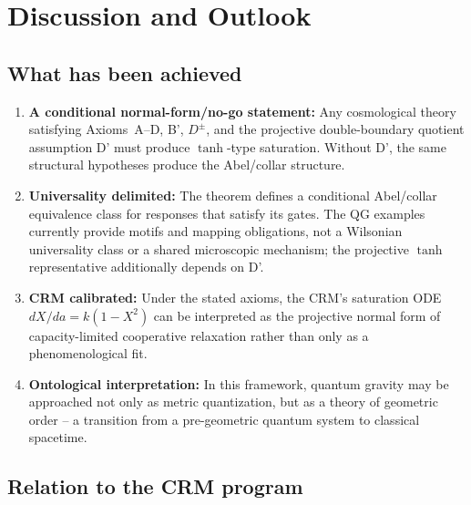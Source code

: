 \documentclass[aps,prd,twocolumn,superscriptaddress,nofootinbib]{revtex4-2}
\begin{document}
\section{Discussion and Outlook}
\label{sec:discussion}

\subsection{What has been achieved}

\begin{enumerate}
\item \textbf{A conditional normal-form/no-go statement:} Any cosmological theory satisfying Axioms~A--D, B', $D^\pm$, and the projective double-boundary quotient assumption D' must produce $\tanh$-type saturation. Without D', the same structural hypotheses produce the Abel/collar structure.

\item \textbf{Universality delimited:} The theorem defines a conditional Abel/collar equivalence class for responses that satisfy its gates. The QG examples currently provide motifs and mapping obligations, not a Wilsonian universality class or a shared microscopic mechanism; the projective $\tanh$ representative additionally depends on D'.

\item \textbf{CRM calibrated:} Under the stated axioms, the CRM's saturation ODE $dX/da = k(1-X^2)$ can be interpreted as the projective normal form of capacity-limited cooperative relaxation rather than only as a phenomenological fit.

\item \textbf{Ontological interpretation:} In this framework, quantum gravity may be approached not only as metric quantization, but as a theory of geometric order -- a transition from a pre-geometric quantum system to classical spacetime.
\end{enumerate}

\subsection{Relation to the CRM program}
\end{document}
